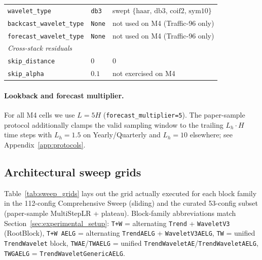 \documentclass{article}
\begin{document}
\begin{table}[h]
\begin{tabular}{@{}lll@{}}
\texttt{wavelet\_type} & \texttt{db3} & swept $\{\text{haar},\,\text{db3},\,\text{coif2},\,\text{sym10}\}$ \\
\texttt{backcast\_wavelet\_type} & \texttt{None} & not used on M4 (Traffic-96 only) \\
\texttt{forecast\_wavelet\_type} & \texttt{None} & not used on M4 (Traffic-96 only) \\
\midrule
\multicolumn{3}{l}{\textit{Cross-stack residuals}} \\
\texttt{skip\_distance} & $0$ & $0$ \\
\texttt{skip\_alpha} & $0.1$ & not exercised on M4 \\
\bottomrule
\end{tabular}
\end{table}

\paragraph{Lookback and forecast multiplier.} For all M4 cells we use $L = 5H$ (\texttt{forecast\_multiplier=5}). The paper-sample protocol additionally clamps the valid sampling window to the trailing $L_h \cdot H$ time steps with $L_h = 1.5$ on Yearly/Quarterly and $L_h = 10$ elsewhere; see Appendix~\ref{app:protocols}.

\subsection{Architectural sweep grids}
\label{app:hyperparams:grids}

Table~\ref{tab:sweep_grids} lays out the grid actually executed for each block family in the 112-config Comprehensive Sweep (sliding) and the curated 53-config subset (paper-sample MultiStepLR + plateau). Block-family abbreviations match Section~\ref{sec:experimental_setup}: \texttt{T+W} = alternating \texttt{Trend} + \texttt{WaveletV3} (RootBlock), \texttt{T+W AELG} = alternating \texttt{TrendAELG} + \texttt{WaveletV3AELG}, \texttt{TW} = unified \texttt{TrendWavelet} block, \texttt{TWAE}/\texttt{TWAELG} = unified \texttt{TrendWaveletAE}/\texttt{TrendWaveletAELG}, \texttt{TWGAELG} = \texttt{TrendWaveletGenericAELG}.
\end{document}
